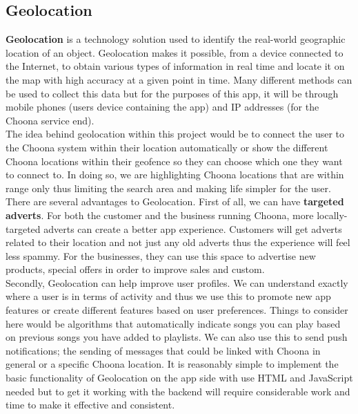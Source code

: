 \subsection{Geolocation}
\textbf{Geolocation} is a technology solution used to identify the real-world geographic location of an object.  Geolocation makes it possible, from a device connected to the Internet, to obtain various types of information in real time and locate it on the map with high accuracy at a given point in time. 
Many different methods can be used to collect this data but for the purposes of this app, it will be through mobile phones (users device containing the app) and IP addresses (for the Choona service end).  \\
The idea behind geolocation within this project would be to connect the user to the Choona system within their location automatically or show the different Choona locations within their geofence so they can choose which one they want to connect to.  In doing so, we are highlighting Choona locations that are within range only thus limiting the search area and making life simpler for the user.  There are several advantages to Geolocation.  First of all, we can have \textbf{targeted adverts}.  For both the customer and the business running Choona, more locally-targeted adverts can create a better app experience.  Customers will get adverts related to their location and not just any old adverts thus the experience will feel less spammy.  For the businesses, they can use this space to advertise new products, special offers in order to improve sales and custom.  \\
Secondly, Geolocation can help improve user profiles.  We can understand exactly where a user is in terms of activity and thus we use this to promote new app features or create different features based on user preferences.  Things to consider here would be algorithms that automatically indicate songs you can play based on previous songs you have added to playlists.  We can also use this to send push notifications; the sending of messages that could be linked with Choona in general or a specific Choona location.  It is reasonably simple to implement the basic functionality of Geolocation on the app side with use HTML and JavaScript needed but to get it working with the backend will require considerable work and time to make it effective and consistent. 

